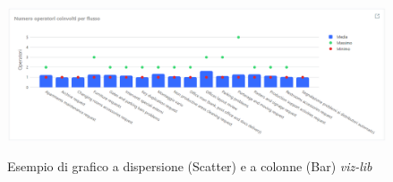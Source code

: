 \begin{figure}[H]
    \centering
    \includegraphics[alt={Esempio di grafico con a dispersione (Scatter) e colonne viz-lib}, width=0.8 \columnwidth, height=\maxdimen, keepaspectratio]{img/ex_scatter_bar.png}
    \caption{Esempio di grafico a dispersione (Scatter) e a colonne (Bar) \textit{viz-lib}}
    \label{fig:scatter-example}
\end{figure}

